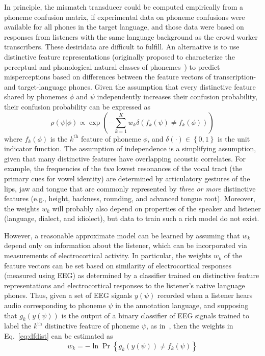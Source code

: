In principle, the mismatch transducer could be computed empirically from
a phoneme confusion matrix, if experimental data on phoneme confusions
were available for all phones in the target language, and those data
were based on responses from listeners with the same language background
as the crowd worker transcribers. These desiridata are difficult to
fulfill. An alternative is to use distinctive feature representations
(originally proposed to characterize the perceptual and phonological
natural classes of phonemes~\cite{Jakobson52}) to predict misperceptions
based on differences between the feature vectors of transcription- and
target-language phones. Given the assumption that every distinctive
feature shared by phonemes $\phi$ and $\psi$ independently increases
their confusion probability, their confusion probability can be
expressed as
\begin{equation}
  \rho(\psi|\phi)\propto \exp\left(-\sum_{k=1}^K
  w_k\delta\left(f_k(\psi)\ne f_k(\phi)\right)\right)
  \label{eq:dfdist}
\end{equation}
where $f_k(\phi)$ is the $k^{\textrm{th}}$ feature of phoneme $\phi$,
and $\delta(\cdot)\in\left\{0,1\right\}$ is the unit indicator
function. The assumption of independence is a simplifying assumption,
given that many distinctive features have overlapping acoustic
correlates. For example, the frequencies of the {\em two} lowest
resonances of the vocal tract (the primary cues for vowel identity) are
determined by articulatory gestures of the lips, jaw and tongue that are
commonly represented by {\em three or more} distinctive features
(e.g., height, backness, rounding, and advanced tongue root). Moreover,
the weights $w_k$ will probably also depend on properties of the speaker
and listener (language, dialect, and idiolect), but data to train such a
rich model do not exist.

However, a reasonable approximate model can be learned by assuming that
$w_k$ depend only on information about the listener, which can be
incorporated via measurements of electrocortical activity. In particular,
the weights $w_k$ of the feature vectors can be set based on similarity
of electrocortical responses (measured using EEG) as determined by a
classifier trained on distinctive feature representations and
electrocortical responses to the listener's native language phones. Thus,
given a set of EEG signals $y(\psi)$ recorded when a listener
hears audio corresponding to phoneme $\psi$ in the annotation
language, and supposing that $g_k(y(\psi))$ is the output of a binary
classifier of EEG signals trained to label the $k^{\textrm{th}}$
distinctive feature of phoneme $\psi$, as in~\cite{Liberto15}, then
the weights in Eq.~\ref{eq:dfdist} can be estimated as
\begin{equation}
  w_k = -\ln\Pr\left\{g_k(y(\psi))\ne f_k(\psi)\right\}
  \label{eq:eegdist}
\end{equation}

